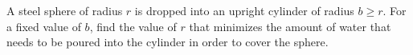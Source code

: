 A steel sphere of radius $r$ is dropped into an upright cylinder of
radius $b \ge r$. For a fixed value of $b$, find the
value of $r$ that minimizes the amount of water that
needs to be poured into the cylinder in order to cover
the sphere.\answercheck

